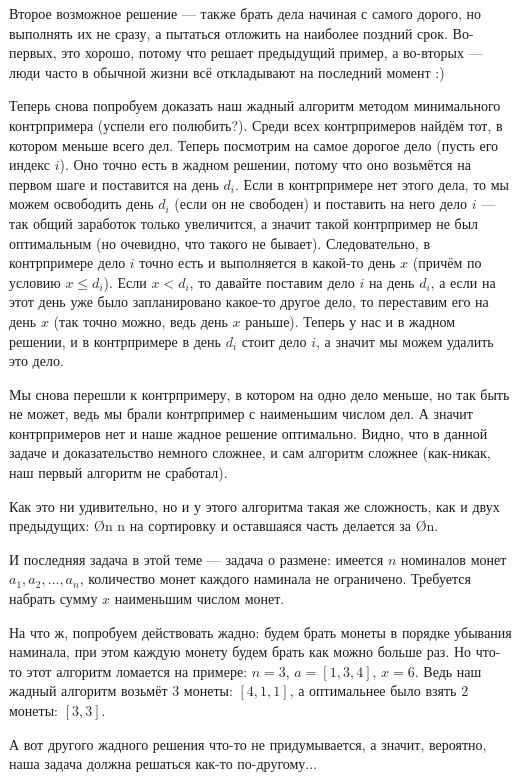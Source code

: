 Второе возможное решение — также брать дела начиная с самого дорого, но выполнять их не сразу, а пытаться отложить на наиболее поздний срок. Во-первых, это хорошо, потому что решает предыдущий пример, а во-вторых — люди часто в обычной жизни всё откладывают на последний момент :)

Теперь снова попробуем доказать наш жадный алгоритм методом минимального контрпримера (успели его полюбить?). Среди всех контрпримеров найдём тот, в котором меньше всего дел. Теперь посмотрим на самое дорогое дело (пусть его индекс $i$). Оно точно есть в жадном решении, потому что оно возьмётся на первом шаге и поставится на день $d_i$. Если в контрпримере нет этого дела, то мы можем освободить день $d_i$ (если он не свободен) и поставить на него дело $i$ — так общий заработок только увеличится, а значит такой контрпример не был оптимальным (но очевидно, что такого не бывает). Следовательно, в контрпримере дело $i$ точно есть и выполняется в какой-то день $x$ (причём по условию $x \leq d_i$). Если $x < d_i$, то давайте поставим дело $i$ на день $d_i$, а если на этот день уже было запланировано какое-то другое дело, то переставим его на день $x$ (так точно можно, ведь день $x$ раньше). Теперь у нас и в жадном решении, и в контрпримере в день $d_i$ стоит дело $i$, а значит мы можем удалить это дело.

Мы снова перешли к контрпримеру, в котором на одно дело меньше, но так быть не может, ведь мы брали контрпример с наименьшим числом дел. А значит контрпримеров нет и наше жадное решение оптимально. Видно, что в данной задаче и доказательство немного сложнее, и сам алгоритм сложнее (как-никак, наш первый алгоритм не сработал).

Как это ни удивительно, но и у этого алгоритма такая же сложность, как и двух предыдущих: \O{n \log n} на сортировку и оставшаяся часть делается за \O{n}.


И последняя задача в этой теме — задача о размене: имеется $n$ номиналов монет $a_1, a_2, \ldots, a_n$, количество монет каждого наминала не ограничено. Требуется набрать сумму $x$ наименьшим числом монет.

На что ж, попробуем действовать жадно: будем брать монеты в порядке убывания наминала, при этом каждую монету будем брать как можно больше раз. Но что-то этот алгоритм ломается на примере: $n = 3$, $a = [1, 3, 4]$, $x = 6$. Ведь наш жадный алгоритм возьмёт $3$ монеты: $[4, 1, 1]$, а оптимальнее было взять $2$ монеты: $[3, 3]$.

А вот другого жадного решения что-то не придумывается, а значит, вероятно, наша задача должна решаться как-то по-другому...

